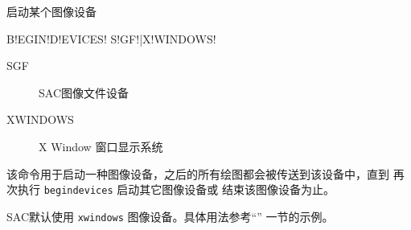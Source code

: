 \label{cmd:begindevices}

启动某个图像设备

\begin{SACSTX}
B!EGIN!D!EVICES! S!GF!|X!WINDOWS!
\end{SACSTX}

\begin{description}
\item [SGF] SAC图像文件设备
\item [XWINDOWS] X Window 窗口显示系统
\end{description}

该命令用于启动一种图像设备，之后的所有绘图都会被传送到该设备中，直到
再次执行 \texttt{begindevices} 启动其它图像设备或 
结束该图像设备为止。

SAC默认使用 \texttt{xwindows} 图像设备。具体用法参考``''
一节的示例。
